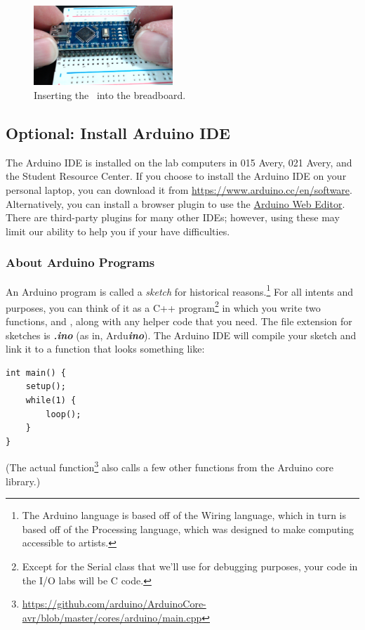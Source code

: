 \begin{figure}
    \centering
    \includegraphics[height=3cm]{inserting-nano}
    \caption{Inserting the \nano\ into the breadboard.
        \label{fig:inserting-nano}}
\end{figure}


\subsection{Optional: Install Arduino IDE}

The Arduino IDE is installed on the lab computers in 015 Avery, 021 Avery, and
the Student Resource Center. If you choose to install the Arduino IDE on your
personal laptop, you can download it from
\url{https://www.arduino.cc/en/software}. Alternatively, you can install a
browser plugin to use the
\href{https://create.arduino.cc/projecthub/Arduino_Genuino/getting-started-with-arduino-web-editor-on-various-platforms-4b3e4a}{Arduino
Web Editor}. There are third-party plugins for many other IDEs; however, using
these may limit our ability to help you if your have difficulties.

\subsubsection*{About Arduino Programs}

An Arduino program is called a \textit{sketch} for historical
reasons.\footnote{The Arduino language is based off of the Wiring language,
which in turn is based off of the Processing language, which was designed to
make computing accessible to artists.} For all intents and purposes, you can
think of it as a C++ program\footnote{Except for the Serial class that we'll
use for debugging purposes, your code in the I/O labs will be C code.} in which
you write two functions,  and , along with
any helper code that you need. The file extension for sketches is
\textbf{\textit{.ino}} (as in, Ardu\textbf{\textit{ino}}). The Arduino IDE will
compile your sketch and link it to a  function that looks
something like:
\begin{lstlisting}
int main() {
    setup();
    while(1) {
        loop();
    }
}
\end{lstlisting}
(The actual  function\footnote{\url{https://github.com/arduino/ArduinoCore-avr/blob/master/cores/arduino/main.cpp}}
also calls a few other functions from the Arduino core library.)

